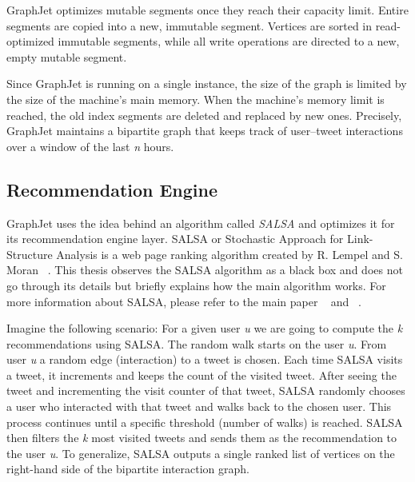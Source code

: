 GraphJet optimizes mutable segments once they reach their capacity limit. Entire segments are copied into a new, immutable segment. Vertices are sorted in read-optimized immutable segments, while all write operations are directed to a new, empty mutable segment.

Since GraphJet is running on a single instance, the size of the graph is limited by the size of the machine's main memory. When the machine's memory limit is reached, the old index segments are deleted and replaced by new ones. Precisely, GraphJet maintains a bipartite graph that keeps track of user–tweet interactions over a window of the last \textit{n} hours.

\subsection{Recommendation Engine}
\label{subsec:GraphJet-Recommendation-Engine}
GraphJet uses the idea behind an algorithm called \emph{SALSA} and optimizes it for its recommendation engine layer. SALSA or Stochastic Approach for Link-Structure Analysis is a web page ranking algorithm created by R. Lempel and S. Moran ~\cite{lempelSALSAStochasticApproach2001}. This thesis observes the SALSA algorithm as a black box and does not go through its details but briefly explains how the main algorithm works. For more information about SALSA, please refer to the main paper ~\cite{lempelSALSAStochasticApproach2001} and ~\cite{sharmaGraphJetRealtimeContent2016}.

Imagine the following scenario: For a given user \textit{u} we are going to compute the \textit{k} recommendations using SALSA. The random walk starts on the user \textit{u}. From user \textit{u} a random edge (interaction) to a tweet is chosen. Each time SALSA visits a tweet, it increments and keeps the count of the visited tweet. After seeing the tweet and incrementing the visit counter of that tweet, SALSA randomly chooses a user who interacted with that tweet and walks back to the chosen user. This process continues until a specific threshold (number of walks) is reached. SALSA then filters the \textit{k} most visited tweets and sends them as the recommendation to the user \textit{u}. To generalize, SALSA outputs a  single ranked list of vertices on the right-hand side of the bipartite interaction graph.


